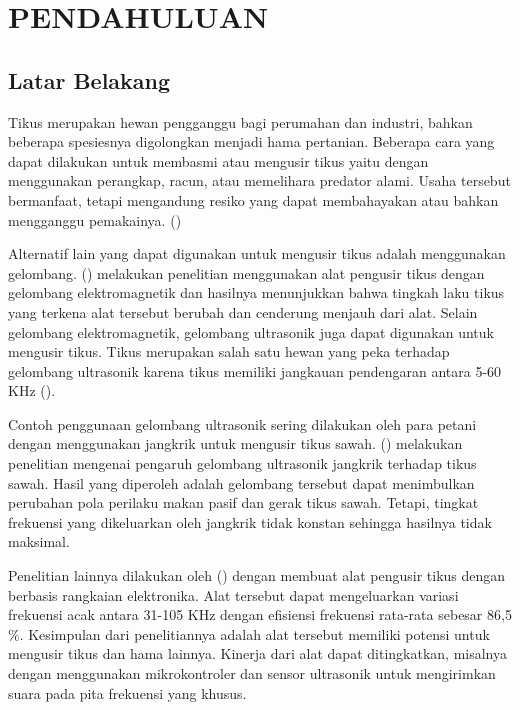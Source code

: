 \section*{PENDAHULUAN} %
\subsection*{Latar Belakang}
Tikus merupakan hewan pengganggu bagi perumahan dan industri, bahkan beberapa spesiesnya digolongkan menjadi hama pertanian. Beberapa cara yang dapat dilakukan untuk membasmi atau mengusir tikus yaitu dengan menggunakan perangkap, racun, atau memelihara predator alami. Usaha tersebut bermanfaat, tetapi mengandung resiko yang dapat membahayakan atau bahkan mengganggu pemakainya.
(\cite*{BAROCH2002})

Alternatif lain yang dapat digunakan untuk mengusir tikus adalah menggunakan gelombang. \citeauthor{BAROCH2002} (\cite*{BAROCH2002})  melakukan penelitian menggunakan alat pengusir tikus dengan gelombang elektromagnetik dan hasilnya menunjukkan bahwa tingkah laku tikus yang terkena alat tersebut berubah dan cenderung menjauh dari alat. Selain gelombang elektromagnetik, gelombang ultrasonik juga dapat digunakan untuk mengusir tikus. Tikus merupakan salah satu hewan yang peka terhadap gelombang ultrasonik karena tikus memiliki jangkauan pendengaran antara 5-60 KHz (\cite{HEFFNER2007}).

Contoh penggunaan gelombang ultrasonik sering dilakukan oleh para petani dengan menggunakan jangkrik untuk mengusir tikus sawah. \citeauthor{TITO2011} (\cite*{TITO2011}) melakukan penelitian mengenai pengaruh gelombang ultrasonik jangkrik terhadap tikus sawah. Hasil yang diperoleh adalah gelombang tersebut dapat menimbulkan perubahan pola perilaku makan pasif dan gerak tikus sawah. Tetapi, tingkat frekuensi yang dikeluarkan oleh jangkrik tidak konstan sehingga hasilnya tidak maksimal.

Penelitian lainnya dilakukan oleh \citeauthor{SIMEON2013} (\cite*{SIMEON2013}) dengan membuat alat pengusir tikus dengan berbasis rangkaian elektronika. Alat tersebut dapat mengeluarkan variasi frekuensi acak antara 31-105 KHz dengan efisiensi frekuensi rata-rata sebesar 86,5$\%$. Kesimpulan dari penelitiannya adalah alat tersebut memiliki potensi untuk mengusir tikus dan hama lainnya. Kinerja dari alat dapat ditingkatkan, misalnya dengan menggunakan mikrokontroler dan sensor ultrasonik untuk mengirimkan suara pada pita frekuensi yang khusus.

